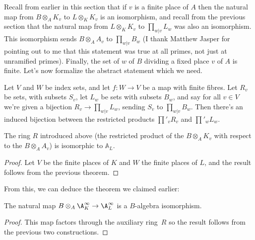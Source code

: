 Recall from earlier in this section that if $v$ is a finite place of $A$ then the natural map from
$B\otimes_A K_v$ to $L\otimes_KK_v$ is an isomorphism, and recall from the previous section
that the natural map from $L\otimes_KK_v$ to $\prod_{w|v}L_w$ was also an isomorphism.
This isomorphism sends $B\otimes_A A_v$ to $\prod_{w|v}B_w$ (I thank Matthew Jasper for
pointing out to me that this statement was true at all primes, not just at unramified primes).
Finally, the set of $w$ of $B$ dividing a fixed place $v$ of $A$ is finite.
Let's now formalize the abstract statement which we need.

\begin{definition}
  \label{RestrictedProduct.relabelIso}
  Let $V$ and $W$ be index sets, and let $f:W\to V$ be a map with finite fibres.
  Let $R_v$ be sets, with subsets $S_v$, let $L_w$ be sets with subsets $B_w$,
  and say for all $v\in V$ we're given a bijection $R_v\to\prod_{w|v}L_w$,
  sending $S_v$ to $\prod_{w|v}B_w$. Then there's an induced bijection between
  the restricted products $\prod'_v R_v$ and $\prod'_w L_w$.
\end{definition}

\begin{corollary}
  \label{IsDedekindDomain.FiniteAdeleRing.IntegraltensorProductAlgEquiv_aux2}
  The ring $R$ introduced above (the restricted
  product of the $B\otimes_A K_v$ with respect to the $B\otimes_A A_v$)
  is isomorphic to $\mathbb{A}_L$.
\end{corollary}
\begin{proof} Let $V$ be the finite places of $K$ and $W$ the finite places of $L$,
  and the result follows from the previous theorem.
\end{proof}
From this, we can deduce the theorem we claimed earlier:

\begin{theorem}
  \label{IsDedekindDomain.FiniteAdeleRing.baseChangeIntegralAlgEquiv}
  The natural map $B\otimes_A\A_K^\infty\to\A_L^\infty$ is a $B$-algebra
  isomorphism.
\end{theorem}
\begin{proof}
  This map factors through the auxiliary ring~$R$ so the result follows
  from the previous two constructions.
\end{proof}

